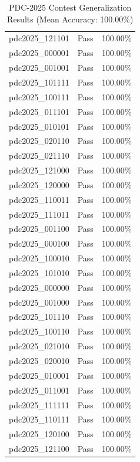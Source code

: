 \begin{table}[ht]
\begin{tabular}{llr}
pdc2025_121101 & Pass & 100.00\% \\
pdc2025_000001 & Pass & 100.00\% \\
pdc2025_001001 & Pass & 100.00\% \\
pdc2025_101111 & Pass & 100.00\% \\
pdc2025_100111 & Pass & 100.00\% \\
pdc2025_011101 & Pass & 100.00\% \\
pdc2025_010101 & Pass & 100.00\% \\
pdc2025_020110 & Pass & 100.00\% \\
pdc2025_021110 & Pass & 100.00\% \\
pdc2025_121000 & Pass & 100.00\% \\
pdc2025_120000 & Pass & 100.00\% \\
pdc2025_110011 & Pass & 100.00\% \\
pdc2025_111011 & Pass & 100.00\% \\
pdc2025_001100 & Pass & 100.00\% \\
pdc2025_000100 & Pass & 100.00\% \\
pdc2025_100010 & Pass & 100.00\% \\
pdc2025_101010 & Pass & 100.00\% \\
pdc2025_000000 & Pass & 100.00\% \\
pdc2025_001000 & Pass & 100.00\% \\
pdc2025_101110 & Pass & 100.00\% \\
pdc2025_100110 & Pass & 100.00\% \\
pdc2025_021010 & Pass & 100.00\% \\
pdc2025_020010 & Pass & 100.00\% \\
pdc2025_010001 & Pass & 100.00\% \\
pdc2025_011001 & Pass & 100.00\% \\
pdc2025_111111 & Pass & 100.00\% \\
pdc2025_110111 & Pass & 100.00\% \\
pdc2025_120100 & Pass & 100.00\% \\
pdc2025_121100 & Pass & 100.00\% \\
\bottomrule
\end{tabular}
\caption{PDC-2025 Contest Generalization Results (Mean Accuracy: 100.00\%)}
\label{tab:contest_results}
\end{table}
